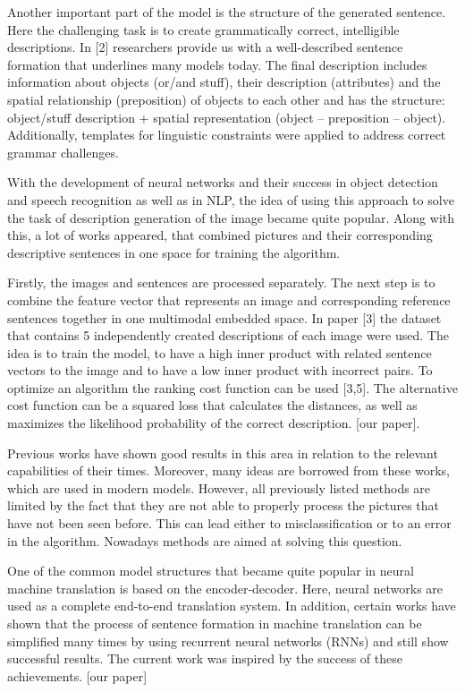 \documentclass[a4paper,UKenglish,cleveref, autoref, thm-restate]{lipics-v2021}
\begin{document}
Another important part of the model is the structure of the generated sentence. Here the challenging task is to create grammatically correct, intelligible descriptions. In [2] researchers provide us with a well-described sentence formation that underlines many models today. The final description includes information about objects (or/and stuff), their description (attributes) and the spatial relationship (preposition) of objects to each other and has the structure: object/stuff description + spatial representation (object – preposition – object). Additionally, templates for linguistic constraints were applied to address correct grammar challenges.

With the development of neural networks and their success in object detection and speech recognition as well as in NLP, the idea of using this approach to solve the task of description generation of the image became quite popular. Along with this, a lot of works appeared, that combined pictures and their corresponding descriptive sentences in one space for training the algorithm.

Firstly, the images and sentences are processed separately. The next step is to combine the feature vector that represents an image and corresponding reference sentences together in one multimodal embedded space. In paper [3] the dataset that contains 5 independently created descriptions of each image were used. The idea is to train the model, to have a high inner product with related sentence vectors to the image and to have a low inner product with incorrect pairs. To optimize an algorithm the ranking cost function can be used [3,5]. The alternative cost function can be a squared loss that calculates the distances, as well as maximizes the likelihood probability of the correct description. [our paper].

Previous works have shown good results in this area in relation to the relevant capabilities of their times. Moreover, many ideas are borrowed from these works, which are used in modern models. However, all previously listed methods are limited by the fact that they are not able to properly process the pictures that have not been seen before. This can lead either to misclassification or to an error in the algorithm. Nowadays methods are aimed at solving this question.

One of the common model structures that became quite popular in neural machine translation is based on the encoder-decoder. Here, neural networks are used as a complete end-to-end translation system. In addition, certain works have shown that the process of sentence formation in machine translation can be simplified many times by using recurrent neural networks (RNNs) and still show successful results. The current work was inspired by the success of these achievements. [our paper]
\end{document}
